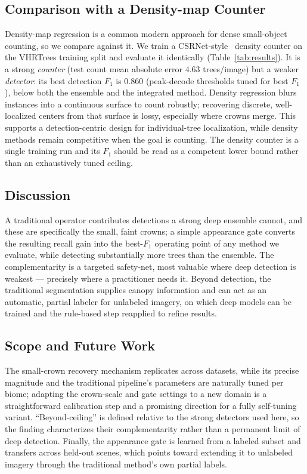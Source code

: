 \documentclass{article}
\begin{document}
\subsection{Comparison with a Density-map Counter}\label{sec:density}
Density-map regression is a common modern approach for dense small-object counting, so we compare against it. We train a CSRNet-style~\cite{li2018csrnet} density counter on the VHRTrees training split and evaluate it identically (Table~\ref{tab:results}). It is a strong \emph{counter} (test count mean absolute error $4.63$ trees/image) but a weaker \emph{detector}: its best detection $F_1$ is $0.860$ (peak-decode thresholds tuned for best $F_1$), below both the ensemble and the integrated method. Density regression blurs instances into a continuous surface to count robustly; recovering discrete, well-localized centers from that surface is lossy, especially where crowns merge. This supports a detection-centric design for individual-tree localization, while density methods remain competitive when the goal is counting. The density counter is a single training run and its $F_1$ should be read as a competent lower bound rather than an exhaustively tuned ceiling.

\subsection{Discussion}
A traditional operator contributes detections a strong deep ensemble cannot, and these are specifically the small, faint crowns; a simple appearance gate converts the resulting recall gain into the best-$F_1$ operating point of any method we evaluate, while detecting substantially more trees than the ensemble. The complementarity is a targeted safety-net, most valuable where deep detection is weakest --- precisely where a practitioner needs it. Beyond detection, the traditional segmentation supplies canopy information and can act as an automatic, partial labeler for unlabeled imagery, on which deep models can be trained and the rule-based step reapplied to refine results.

\subsection{Scope and Future Work}
The small-crown recovery mechanism replicates across datasets, while its precise magnitude and the traditional pipeline's parameters are naturally tuned per biome; adapting the crown-scale and gate settings to a new domain is a straightforward calibration step and a promising direction for a fully self-tuning variant. ``Beyond-ceiling'' is defined relative to the strong detectors used here, so the finding characterizes their complementarity rather than a permanent limit of deep detection. Finally, the appearance gate is learned from a labeled subset and transfers across held-out scenes, which points toward extending it to unlabeled imagery through the traditional method's own partial labels.
\end{document}
